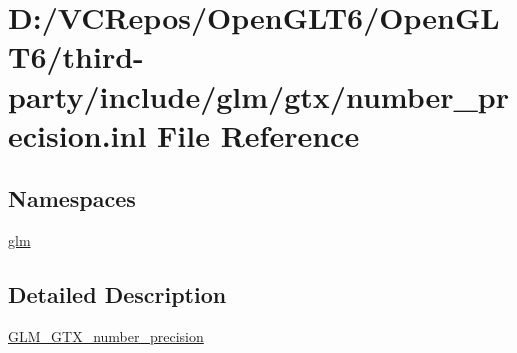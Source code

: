 \hypertarget{number__precision_8inl}{}\section{D\+:/\+V\+C\+Repos/\+Open\+G\+L\+T6/\+Open\+G\+L\+T6/third-\/party/include/glm/gtx/number\+\_\+precision.inl File Reference}
\label{number__precision_8inl}
\subsection*{Namespaces}
\begin{DoxyCompactItemize}
\item 
 \mbox{\hyperlink{namespaceglm}{glm}}
\end{DoxyCompactItemize}


\subsection{Detailed Description}
\mbox{\hyperlink{group__gtx__number__precision}{G\+L\+M\+\_\+\+G\+T\+X\+\_\+number\+\_\+precision}} 